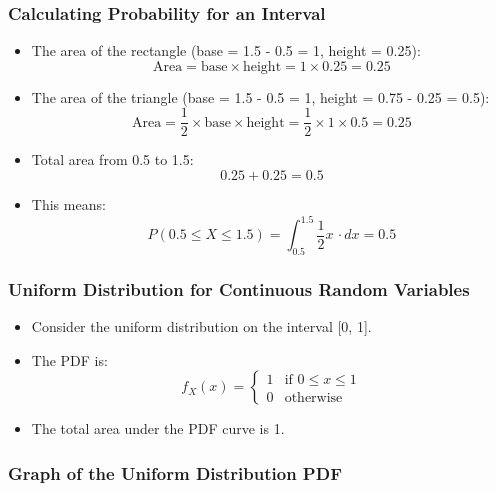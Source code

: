 \documentclass[handout]{beamer} %
\begin{document}
\begin{frame}
\frametitle{Calculating Probability for an Interval}
 
    \begin{itemize}
        \item The area of the rectangle (base = 1.5 - 0.5 = 1, height = 0.25):
        \[
        \text{Area} = \text{base} \times \text{height} = 1 \times 0.25 = 0.25
        \] \pause 
        \item The area of the triangle (base = 1.5 - 0.5 = 1, height = 0.75 - 0.25 = 0.5):
        \[
        \text{Area} = \frac{1}{2} \times \text{base} \times \text{height} = \frac{1}{2} \times 1 \times 0.5 = 0.25
        \] \pause 
        \item Total area from 0.5 to 1.5:
        \[
        0.25 + 0.25 = 0.5
        \] \pause 
        \item This means:
        \[
        P(0.5 \leq X \leq 1.5) = \int_{0.5}^{1.5} \frac{1}{2}x \, \cdot dx = 0.5
        \]
    \end{itemize}
\end{frame}

\begin{frame}
\frametitle{Uniform Distribution for Continuous Random Variables}
    \begin{itemize}
        \item Consider the uniform distribution on the interval [0, 1]. \pause
        \item The PDF is: \pause
        \[
        f_X(x) = \begin{cases} 
        1 & \text{if } 0 \leq x \leq 1 \\
        0 & \text{otherwise}
        \end{cases}
        \] \pause
        \item The total area under the PDF curve is 1.
    \end{itemize}
\end{frame}

\begin{frame}
\frametitle{Graph of the Uniform Distribution PDF}
\end{frame}
\end{document}

